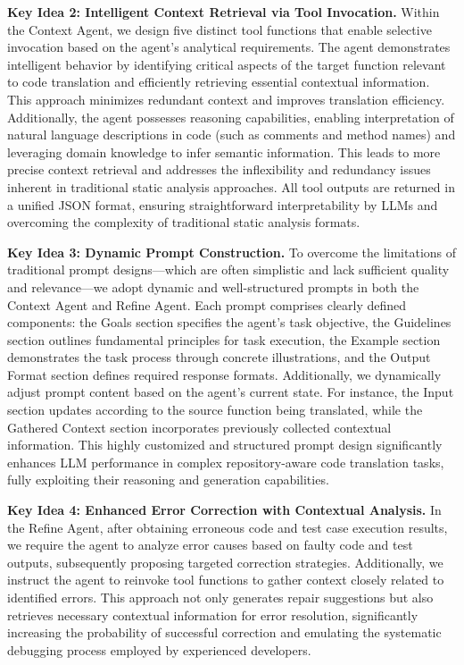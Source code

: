 \textbf{Key Idea 2: Intelligent Context Retrieval via Tool Invocation.}
Within the Context Agent, we design five distinct tool functions that enable selective invocation based on the agent's analytical requirements. The agent demonstrates intelligent behavior by identifying critical aspects of the target function relevant to code translation and efficiently retrieving essential contextual information. This approach minimizes redundant context and improves translation efficiency. Additionally, the agent possesses reasoning capabilities, enabling interpretation of natural language descriptions in code (such as comments and method names) and leveraging domain knowledge to infer semantic information. This leads to more precise context retrieval and addresses the inflexibility and redundancy issues inherent in traditional static analysis approaches. All tool outputs are returned in a unified JSON format, ensuring straightforward interpretability by LLMs and overcoming the complexity of traditional static analysis formats.

\textbf{Key Idea 3: Dynamic Prompt Construction.}
To overcome the limitations of traditional prompt designs—which are often simplistic and lack sufficient quality and relevance—we adopt dynamic and well-structured prompts in both the Context Agent and Refine Agent. Each prompt comprises clearly defined components: the Goals section specifies the agent's task objective, the Guidelines section outlines fundamental principles for task execution, the Example section demonstrates the task process through concrete illustrations, and the Output Format section defines required response formats. Additionally, we dynamically adjust prompt content based on the agent's current state. For instance, the Input section updates according to the source function being translated, while the Gathered Context section incorporates previously collected contextual information. This highly customized and structured prompt design significantly enhances LLM performance in complex repository-aware code translation tasks, fully exploiting their reasoning and generation capabilities.

\textbf{Key Idea 4: Enhanced Error Correction with Contextual Analysis.}
In the Refine Agent, after obtaining erroneous code and test case execution results, we require the agent to analyze error causes based on faulty code and test outputs, subsequently proposing targeted correction strategies. Additionally, we instruct the agent to reinvoke tool functions to gather context closely related to identified errors. This approach not only generates repair suggestions but also retrieves necessary contextual information for error resolution, significantly increasing the probability of successful correction and emulating the systematic debugging process employed by experienced developers.